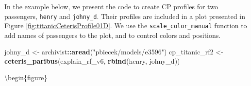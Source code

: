 \documentclass[12pt,]{krantz}
\newenvironment{Shaded}{\begin{snugshade}}{\end{snugshade}}
\newcommand{\DataTypeTok}[1]{\textcolor[rgb]{0.13,0.29,0.53}{#1}}
\newcommand{\DecValTok}[1]{\textcolor[rgb]{0.00,0.00,0.81}{#1}}
\newcommand{\KeywordTok}[1]{\textcolor[rgb]{0.13,0.29,0.53}{\textbf{#1}}}
\newcommand{\NormalTok}[1]{#1}
\newcommand{\OperatorTok}[1]{\textcolor[rgb]{0.81,0.36,0.00}{\textbf{#1}}}
\newcommand{\StringTok}[1]{\textcolor[rgb]{0.31,0.60,0.02}{#1}}
\begin{document}
In the example below, we present the code to create CP profiles for two passengers, \texttt{henry} and \texttt{johny\_d}. Their profiles are included in a plot presented in Figure \ref{fig:titanicCeterisProfile01D}. We use the \texttt{scale\_color\_manual} function to add names of passengers to the plot, and to control colors and positions.

\begin{Shaded}
\begin{Highlighting}[]
\NormalTok{johny_d <-}\StringTok{ }\NormalTok{archivist}\OperatorTok{::}\KeywordTok{aread}\NormalTok{(}\StringTok{"pbiecek/models/e3596"}\NormalTok{)}
\NormalTok{cp_titanic_rf2 <-}\StringTok{ }\KeywordTok{ceteris_paribus}\NormalTok{(explain_rf_v6, }\KeywordTok{rbind}\NormalTok{(henry, johny_d))}
\end{Highlighting}
\end{Shaded}

\begin{Shaded}
\end{Shaded}

\textbackslash{}begin\{figure\}
\end{document}
